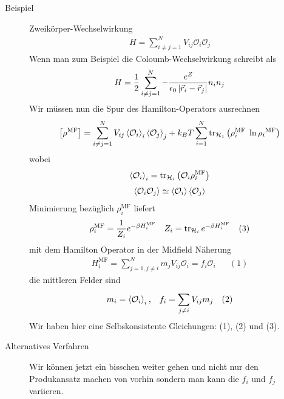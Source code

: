 \begin{description}
  \item[Beispiel] Zweikörper-Wechselwirkung
    \begin{align*}
      H = \sum_{i\neq j = 1}^{N} V_{ij} \mathcal{O}_i \mathcal{O}_j
    \end{align*}
    Wenn man zum Beispiel die Coloumb-Wechselwirkung schreibt als
    \begin{align*}
      H = \frac{1}{2}\sum_{i \neq j = 1}^{N} - \frac{e^Z}{\epsilon_0 \left| \vec{r}_i - \vec{r}_j \right|} n_i n_j
    \end{align*}
    Wir müssen nun die Spur des Hamilton-Operators ausrechnen
    \begin{align*}
      \left[ \rho^\text{MF} \right] = \sum_{i \neq j =1}^{N} V_{ij} \Braket{\mathcal{O}_i}_i \Braket{\mathcal{O}_j}_j
      + k_B T \sum_{i=1}^{N} \operatorname{tr}_{\mathcal{H}_1} \left( \rho_i^\text{MF } \ln{\rho_i}^\text{MF} \right)
    \end{align*}
    wobei
    \begin{align*}
      \Braket{\mathcal{O}_i}_i = \operatorname{tr}_{\mathcal{H}_i} \left( \mathcal{O}_i \rho_i^\text{MF} \right)
    \end{align*}
    \begin{align*}
      \Braket{\mathcal{O}_i \mathcal{O}_j} \simeq \Braket{\mathcal{O}_i}\Braket{\mathcal{O}_j}
    \end{align*}
    Minimierung bezüglich $\rho_i^\text{MF}$ liefert
    \begin{align*}
      \rho_i^\text{MF} = \frac{1}{Z_i} e^{- \beta H_i^\text{MF}} && Z_i = \operatorname{tr}_{\mathcal{H}_i} e ^{-\beta H_i^\text{MF}} && (3)
    \end{align*}
    mit dem Hamilton Operator in der Midfield Näherung 
    \begin{align*}
      H_i^\text{MF} = \sum_{j=1, j\neq i}^{N} m_j V_{ij} \mathcal{O}_i =  f_i \mathcal{O}_i  && (1)
    \end{align*}
    die mittleren Felder sind
    \begin{align*}
      m_i = \Braket{\mathcal{O}_i}_i,  && f_i = \sum_{j \neq i }^{}V_{ij} m_j && (2)
    \end{align*}
    Wir haben hier eine Selbskonsistente Gleichungen: (1), (2) und (3).
  \item[Alternatives Verfahren]
    Wir können jetzt ein bisschen weiter gehen und nicht nur den Produkansatz machen
    von vorhin sondern man kann die $f_i$ und $f_j$ variieren.

\end{description}
